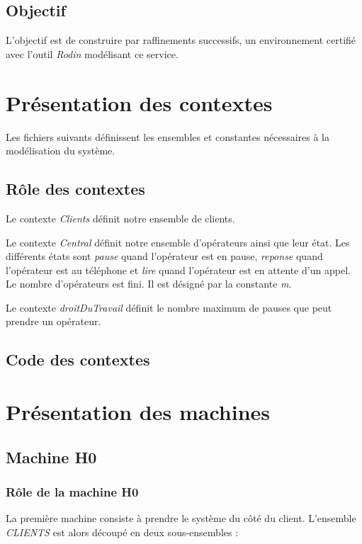 \documentclass{article}
\begin{document}
  \subsection{Objectif}
  L'objectif est de construire par raffinements successifs, un
  environnement certifié avec l'outil \emph{Rodin} modélisant ce
  service.\newline

 \section{Présentation des contextes}
 Les fichiers suivants définissent les ensembles et constantes
 nécessaires à la modélisation du système. 
 
  \subsection{Rôle des contextes}
  Le contexte \emph{Clients} définit notre ensemble de clients.\newline
  
  \indent Le contexte \emph{Central} définit notre ensemble d'opérateurs
  ainsi que leur état.\newline
  Les différents états sont \emph{pause} quand l'opérateur est en pause,
  \emph{reponse} quand l'opérateur est au téléphone et \emph{lire} quand
  l'opérateur est en attente d'un appel.\newline
  Le nombre d'opérateurs est fini. Il est désigné par la constante
  \emph{m}.

  \indent Le contexte \emph{droitDuTravail} définit le nombre maximum de
  pauses que peut prendre un opérateur. 

  \subsection{Code des contextes}

  
  
  

 \section{Présentation des machines}
 
  \subsection{Machine H0}
  
   \subsubsection{Rôle de la machine H0}
   La première machine consiste à prendre le système du côté du
   client. L'ensemble \emph{CLIENTS} est alors découpé en deux
   sous-ensembles : 
\end{document}
